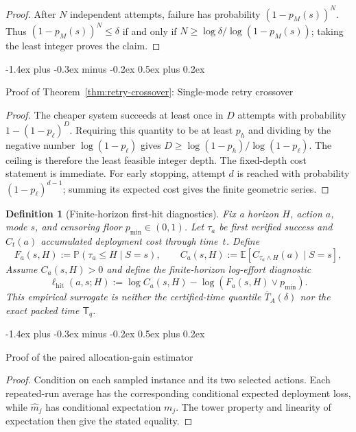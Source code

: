 \documentclass[10pt,twocolumn]{article}
\makeatletter
\theoremstyle{paperplain}
\theoremstyle{paperdefinition}
\newtheorem{definition}[theorem]{Definition}
\theoremstyle{paperremark}
\renewcommand{\subsection}{%
  \@startsection{subsection}{2}{\z@}%
    {-1.4ex plus -0.3ex minus -0.2ex}%
    {0.5ex plus 0.2ex}%
    {\normalfont\normalsize\bfseries\raggedright}}
\newcommand{\E}{\mathbb{E}}
\newcommand{\Prb}{\mathbb{P}}
\makeatother
\begin{document}
\begin{proof}
After $N$ independent attempts, failure has probability $(1-p_M(s))^N$.
Thus $(1-p_M(s))^N\le\delta$ if and only if
$N\ge\log\delta/\log(1-p_M(s))$; taking the least integer proves the claim.
\end{proof}

\subsection{Proof of Theorem~\ref{thm:retry-crossover}: Single-mode retry crossover}
\label{app:proof:retry-crossover}

\begin{proof}
The cheaper system succeeds at least once in $D$ attempts with probability
$1-(1-p_\ell)^D$.
Requiring this quantity to be at least $p_h$ and dividing by the negative number
$\log(1-p_\ell)$ gives
$D\ge\log(1-p_h)/\log(1-p_\ell)$.
The ceiling is therefore the least feasible integer depth.
The fixed-depth cost statement is immediate.
For early stopping, attempt $d$ is reached with probability $(1-p_\ell)^{d-1}$; summing its expected cost gives the finite geometric series.
\end{proof}

\begin{definition}[Finite-horizon first-hit diagnostics]
\label{def:first-hit-diagnostics}
Fix a horizon $H$, action $a$, mode $s$, and censoring floor $p_{\min}\in(0,1)$.
Let $\tau_a$ be first verified success and $C_t(a)$ accumulated deployment cost through time~$t$.
Define
\[
F_a(s,H):=\Prb(\tau_a\le H\mid S=s),
\qquad
C_a(s,H):=\E[C_{\tau_a\wedge H}(a)\mid S=s],
\]
Assume $C_a(s,H)>0$ and define the finite-horizon log-effort diagnostic
\[
\ell_{\mathrm{hit}}(a,s;H)
:=
\log C_a(s,H)-\log(F_a(s,H)\vee p_{\min}).
\]
This empirical surrogate is neither the certified-time quantile $\overline T_A(\delta)$ nor the exact packed time $\mathsf T_q$.
\end{definition}

\subsection{Proof of the paired allocation-gain estimator}
\label{app:proof:paired-estimator}

\begin{proof}
Condition on each sampled instance and its two selected actions.
Each repeated-run average has the corresponding conditional expected deployment loss, while $\widehat m_j$ has conditional expectation $m_j$.
The tower property and linearity of expectation then give the stated equality.
\end{proof}
\end{document}
